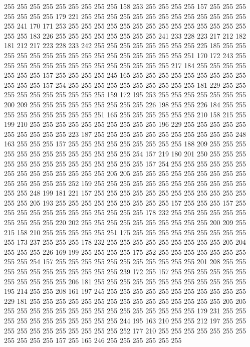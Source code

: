 255 255 255 255 255 255 255 255 255 158 253 255 255 255 255 157 255 255 255 255
255 255 255 179 221 255 255 255 255 255 255 255 255 255 255 255 255 255 255 241
170 171 253 255 255 255 255 255 255 255 255 255 255 255 255 255 255 255 255 183
226 255 255 255 255 255 255 255 255 241 233 228 223 217 212 182 181 212 217 223
228 233 242 255 255 255 255 255 255 255 255 225 185 255 255 255 255 255 255 255
255 255 255 255 255 255 255 255 255 251 170 172 243 255 255 255 255 255 255 255
255 255 255 255 255 255 255 217 184 255 255 255 255 255 255 255 157 255 255 255
255 245 165 255 255 255 255 255 255 255 255 255 255 255 255 157 254 255 255 255
255 255 255 255 255 255 255 181 229 255 255 255 255 255 255 255 255 255 255 159
172 195 253 255 255 255 255 255 255 255 200 209 255 255 255 255 255 255 255 255
255 226 198 255 255 226 184 255 255 255 255 255 255 255 255 255 251 165 255 255
255 255 255 255 210 158 215 255 199 210 255 255 255 255 255 255 255 255 255 255
196 229 255 255 255 255 255 255 255 255 255 255 223 187 255 255 255 255 255 255
255 255 255 255 255 248 163 255 255 255 157 255 255 255 255 255 255 255 255 255
188 209 255 255 255 255 255 255 255 255 255 255 255 255 255 254 157 219 180 201
250 255 255 255 255 255 255 255 255 255 255 255 255 255 255 157 254 255 255 255
255 255 255 255 255 255 255 255 255 255 255 205 205 255 255 255 255 255 255 255
255 255 255 255 255 255 255 252 159 255 255 255 255 255 255 255 255 255 255 255
255 255 255 248 199 181 221 157 255 255 255 255 255 255 255 255 255 255 255 255
255 255 205 193 255 255 255 255 255 255 255 255 255 157 255 255 255 157 255 255
255 255 255 255 255 255 255 255 255 255 178 232 255 255 255 255 255 255 255 255
255 255 220 202 255 255 255 255 255 255 255 255 255 255 200 209 255 215 158 210
255 255 255 255 255 251 175 255 255 255 255 255 255 255 255 255 255 173 237 255
255 255 178 232 255 255 255 255 255 255 255 255 255 205 204 255 255 255 226 169
199 255 255 255 255 175 252 255 255 255 255 255 255 255 255 255 254 157 255 255
255 255 255 255 255 255 255 255 255 201 208 255 255 255 255 255 255 255 255 255
255 255 239 172 255 157 255 255 255 255 255 255 255 255 255 255 255 206 181 255
255 255 255 255 255 255 255 255 255 255 255 195 214 255 255 208 161 197 245 255
255 255 255 255 255 255 255 255 255 255 229 181 255 255 255 255 255 255 255 255
255 255 255 255 255 255 255 205 205 255 255 255 255 255 255 255 255 255 255 255
255 255 255 255 179 231 255 255 255 255 255 255 255 255 255 255 255 244 195 163
210 255 255 212 197 255 255 255 255 255 255 255 255 255 255 255 252 177 210 255
255 255 255 255 255 255 255 255 255 255 157 255 165 246 255 255 255 255 255 255
